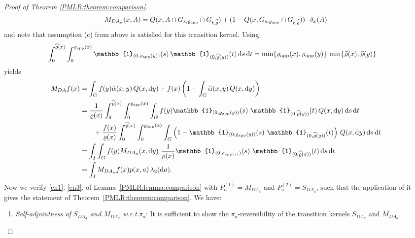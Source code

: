 \documentclass[sn-mathphys-num]{sn-jnl}%
\theoremstyle{thmstyleone}%
\theoremstyle{thmstyletwo}%
\theoremstyle{thmstylethree}%
\newcommand{\rhoapp}{\varrho_{{\rm app}}}
\begin{document}
\begin{appendices}
\begin{proof}[Proof of Theorem \ref{PMLR:theorem:comparison}]
\begin{align*}
		M_{DA_{{a}}}(x,A)=  Q(x, A  \cap  G_{s,\rhoapp}  \cap  G_{t,\widehat{\varrho}}) +(1- Q(x, G_{s,\rhoapp}  \cap  G_{t,\widehat{\varrho}})) \cdot \delta_x(A)   
	\end{align*}
	and note that assumption (c) from above is satisfied for this transition kernel.
	Using
	\begin{align*}
		\int_0^{\widehat{\varrho}(x)} \int_0^{\rhoapp(x)} \mathbb{1}_{(0,\varrho_{\textmd{app}}(y))}(s) \, \mathbb{1}_{(0,\widehat{\varrho}(y))}(t)  \, \mathrm{d}s  \, \mathrm{d}t 
		& = \min\{\rhoapp(x),\rhoapp(y)\} \, \min\{\widehat{\varrho}(x), \widehat{\varrho}(y)\}       
	\end{align*}
	yields
	\begin{align*}
		M_{DA}f(x)& = \int_G f(y) \widetilde{\alpha}(x,y)  \, Q(x,\mathrm{d}y) +f(x)\left(1-\int_{G} \widetilde{\alpha}(x,y)  \, Q(x,\mathrm{d}y)\right)\\
		&= \frac{1}{\varrho(x)} \int_0^{\widehat{\varrho}(x)} \int_0^{\rhoapp(x)} \int_G f(y)  \mathbb{1}_{(0,\varrho_{\textmd{app}}(y))}(s)\ \mathbb{1}_{(0,\widehat{\varrho}(y))}(t)  \, Q(x, \mathrm{d}y)  \, \mathrm{d}s  \, \mathrm{d}t \\ 
		&\qquad	+  \frac{f(x)}{\varrho(x)} \int_0^{\widehat{\varrho}(x)} \int_0^{\rhoapp(x)} \int_G  \left(1- \mathbb{1}_{(0,\varrho_{\textmd{app}}(y))}(s)\ \mathbb{1}_{(0,\widehat{\varrho}(y))}(t)\right)  \, Q(x, \mathrm{d}y)  \, \mathrm{d}s  \, \mathrm{d}t\\	
		&= \int_I \int_G f(y)  M_{DA_{{a}}}(x,\mathrm{d}y) \ \frac{1}{\varrho(x)}\mathbb{1}_{(0,\varrho_{\textmd{app}(x)})}(s)\ \mathbb{1}_{(0,\widehat{\varrho}(x))}(t)  \, \mathrm{d}s  \, \mathrm{d}t \\ 
		&= \int_I   M_{DA_{{a}}}f(x) p(x,{a}) \,\lambda_2(\mathrm{d}{a}).
	\end{align*}
	Now we verify \ref{en1}.-\ref{en3}. of Lemma~\ref{PMLR:lemma:comparison} with $P_a^{(1)}=M_{DA_{{a}}}$ and $P_a^{(2)}=S_{DA_{{a}}}$, such that the application of it gives the statement of Theorem~\ref{PMLR:theorem:comparison}. We have:
	\begin{enumerate}
		\item
		\emph{Self-adjointness of $S_{DA_{{a}}}$ and $M_{DA_{{a}}}$ w.r.t.\phantom{.}$\pi_{{a}}$}: It is sufficient to show the $\pi_{{a}}$-reversibility of the transition kernels $S_{DA_{{a}}}$ and $M_{DA_{{a}}}$. 

\end{enumerate}
\end{proof}
\end{appendices}
\end{document}
